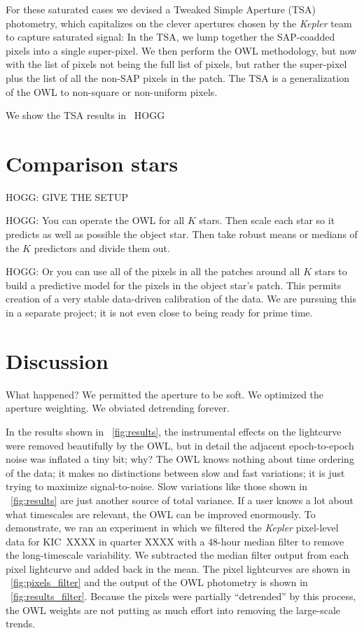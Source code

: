 \documentclass[12pt, letterpaper, preprint]{aastex}
\newcommand{\project}[1]{\textsl{#1}}
\begin{document}
For these saturated cases we devised a Tweaked Simple Aperture (TSA) photometry,
  which capitalizes on the clever apertures chosen by the \project{Kepler} team
  to capture saturated signal:
In the TSA, we lump together the SAP-coadded pixels into a single super-pixel.
We then perform the OWL methodology,
  but now with the list of pixels not being the full list of pixels,
  but rather the super-pixel plus the list of all the non-SAP pixels in the patch.
The TSA is a generalization of the OWL to non-square or non-uniform pixels.

We show the TSA results in \figurename~HOGG

\section{Comparison stars}

HOGG:  GIVE THE SETUP

HOGG:  You can operate the OWL for all $K$ stars.
Then scale each star so it predicts as well as possible the object star.
Then take robust means or medians of the $K$ predictors and divide them out.

HOGG:  Or you can use all of the pixels in all the patches around all $K$ stars
  to build a predictive model for the pixels in the object star's patch.
This permits creation of a very stable data-driven calibration of the data.
We are pursuing this in a separate project;
  it is not even close to being ready for prime time.

\section{Discussion}

What happened?
We permitted the aperture to be soft.
We optimized the aperture weighting.
We obviated detrending forever.

In the results shown in \figurename~\ref{fig:results},
  the instrumental effects on the lightcurve were removed beautifully by the OWL,
  but in detail
  the adjacent epoch-to-epoch noise was inflated a tiny bit;
  why?
The OWL knows nothing about time ordering of the data;
  it makes no distinctions between slow and fast variations;
  it is just trying to maximize signal-to-noise.
Slow variations like those shown in \figurename~\ref{fig:results}
  are just another source of total variance.
If a user knows a lot about what timescales are relevant,
  the OWL can be improved enormously.
To demonstrate, we ran an experiment in which we filtered the \project{Kepler} pixel-level data
  for KIC~XXXX in quarter XXXX
  with a 48-hour median filter to remove the long-timescale variability.
We subtracted the median filter output from each pixel lightcurve and added back in the mean.
The pixel lightcurves are shown in \figurename~\ref{fig:pixels_filter}
  and the output of the OWL photometry is shown in \figurename~\ref{fig:results_filter}.
Because the pixels were partially ``detrended'' by this process,
  the OWL weights are not putting as much effort into removing the large-scale trends.
\end{document}
